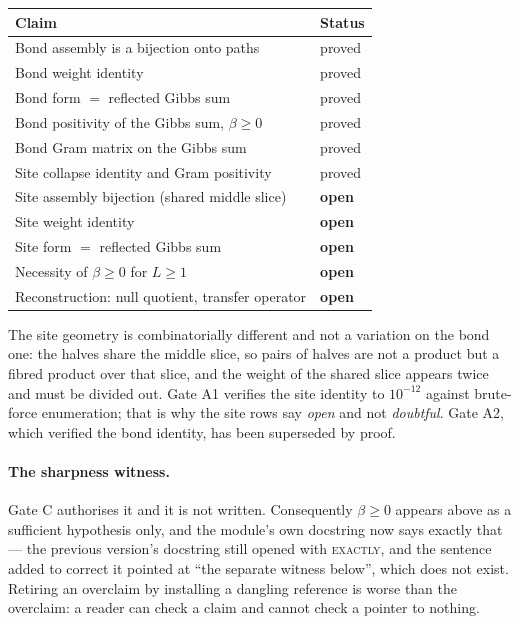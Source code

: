\documentclass[11pt]{article}
\theoremstyle{definition}
\begin{document}
\begin{center}
\begin{tabular}{ll}
\toprule
Claim & Status \\
\midrule
Bond assembly is a bijection onto paths & proved \\
Bond weight identity & proved \\
Bond form $=$ reflected Gibbs sum & proved \\
Bond positivity of the Gibbs sum, $\beta\ge0$ & proved \\
Bond Gram matrix on the Gibbs sum & proved \\
Site collapse identity and Gram positivity & proved \\
Site assembly bijection (shared middle slice) & \textbf{open} \\
Site weight identity & \textbf{open} \\
Site form $=$ reflected Gibbs sum & \textbf{open} \\
Necessity of $\beta\ge0$ for $L\ge1$ & \textbf{open} \\
Reconstruction: null quotient, transfer operator & \textbf{open} \\
\bottomrule
\end{tabular}
\end{center}

The site geometry is combinatorially different and not a variation on the bond
one: the halves share the middle slice, so pairs of halves are not a product but
a fibred product over that slice, and the weight of the shared slice appears
twice and must be divided out.  Gate A1 verifies the site identity to
$10^{-12}$ against brute-force enumeration; that is why the site rows say
\emph{open} and not \emph{doubtful}.  Gate A2, which verified the bond identity,
has been superseded by proof.

\paragraph{The sharpness witness.}  Gate C authorises it and it is not written.
Consequently $\beta\ge0$ appears above as a sufficient hypothesis only, and the
module's own docstring now says exactly that --- the previous version's docstring
still opened with \textsc{exactly}, and the sentence added to correct it pointed
at ``the separate witness below'', which does not exist.  Retiring an overclaim
by installing a dangling reference is worse than the overclaim: a reader can
check a claim and cannot check a pointer to nothing.
\end{document}
